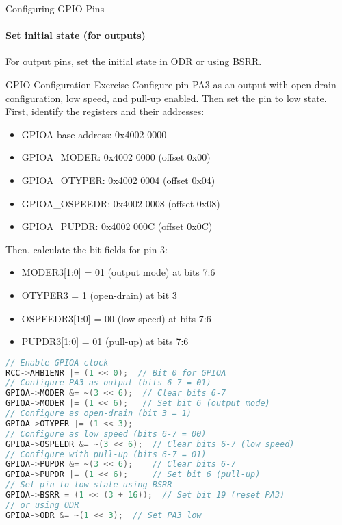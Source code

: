 \begin{KR}{Configuring GPIO Pins}
\paragraph{Set initial state (for outputs)}
For output pins, set the initial state in ODR or using BSRR.
\end{KR}


\begin{example2}{GPIO Configuration Exercise}
Configure pin PA3 as an output with open-drain configuration, low speed, and pull-up enabled. Then set the pin to low state.
\tcblower
First, identify the registers and their addresses:
\begin{itemize}
    \item GPIOA base address: 0x4002 0000
    \item GPIOA\_MODER: 0x4002 0000 (offset 0x00)
    \item GPIOA\_OTYPER: 0x4002 0004 (offset 0x04)
    \item GPIOA\_OSPEEDR: 0x4002 0008 (offset 0x08)
    \item GPIOA\_PUPDR: 0x4002 000C (offset 0x0C)
\end{itemize}

Then, calculate the bit fields for pin 3:
\begin{itemize}
    \item MODER3[1:0] = 01 (output mode) at bits 7:6
    \item OTYPER3 = 1 (open-drain) at bit 3
    \item OSPEEDR3[1:0] = 00 (low speed) at bits 7:6
    \item PUPDR3[1:0] = 01 (pull-up) at bits 7:6
\end{itemize}

\begin{lstlisting}[language=C, style=basesmol] 
// Enable GPIOA clock
RCC->AHB1ENR |= (1 << 0);  // Bit 0 for GPIOA
// Configure PA3 as output (bits 6-7 = 01)
GPIOA->MODER &= ~(3 << 6);  // Clear bits 6-7
GPIOA->MODER |= (1 << 6);   // Set bit 6 (output mode)
// Configure as open-drain (bit 3 = 1)
GPIOA->OTYPER |= (1 << 3);  
// Configure as low speed (bits 6-7 = 00)
GPIOA->OSPEEDR &= ~(3 << 6);  // Clear bits 6-7 (low speed)
// Configure with pull-up (bits 6-7 = 01)
GPIOA->PUPDR &= ~(3 << 6);    // Clear bits 6-7
GPIOA->PUPDR |= (1 << 6);     // Set bit 6 (pull-up)
// Set pin to low state using BSRR
GPIOA->BSRR = (1 << (3 + 16));  // Set bit 19 (reset PA3)
// or using ODR
GPIOA->ODR &= ~(1 << 3);  // Set PA3 low
\end{lstlisting}
\end{example2}

